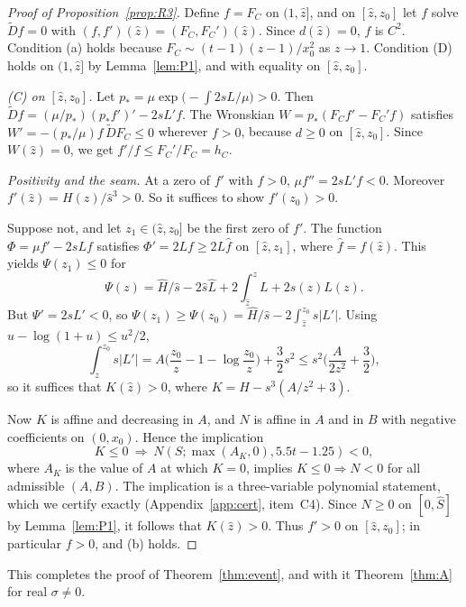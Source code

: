 \documentclass[11pt]{amsart}
\theoremstyle{definition}
\theoremstyle{remark}
\numberwithin{equation}{section}
\begin{document}
\begin{proof}[Proof of Proposition~\ref{prop:R3}]
Define $f=F_C$ on $(1,\hat z]$, and on $[\hat z,z_0]$ let $f$ solve $\widetilde Df=0$ with $(f,f')(\hat z)=(F_C,F_C')(\hat z)$.
Since $d(\hat z)=0$, $f$ is $C^2$. Condition (a) holds because $F_C\sim(t-1)(z-1)/x_0^2$ as $z\to1$. Condition (D) holds on
$(1,\hat z]$ by Lemma~\ref{lem:P1}, and with equality on $[\hat z,z_0]$.

\emph{(C) on $[\hat z,z_0]$.} Let $p_*=\mu\exp\big(-\int2sL/\mu\big)>0$. Then
$\widetilde Df=(\mu/p_*)(p_*f')'-2sL'f$. The Wronskian $W=p_*(F_Cf'-F_C'f)$ satisfies
$W'=-(p_*/\mu)f\,\widetilde DF_C\le0$ wherever $f>0$, because $d\ge0$ on $[\hat z,z_0]$. Since $W(\hat z)=0$, we get
$f'/f\le F_C'/F_C=h_C$.

\emph{Positivity and the seam.} At a zero of $f'$ with $f>0$, $\mu f''=2sL'f<0$. Moreover
$f'(\hat z)=H(\hat z)/\hat s^3>0$. So it suffices to show $f'(z_0)>0$.

Suppose not, and let $z_1\in(\hat z,z_0]$ be the first zero of $f'$. The function $\Phi=\mu f'-2sLf$ satisfies
$\Phi'=2Lf\ge2L\hat f$ on $[\hat z,z_1]$, where $\hat f=f(\hat z)$. This yields
$\Psi(z_1)\le0$ for
\[
\Psi(z)=\hat H/\hat s-2\hat s\hat L+2\int_{\hat z}^zL+2s(z)L(z).
\]
But $\Psi'=2sL'<0$, so $\Psi(z_1)\ge\Psi(z_0)=\hat H/\hat s-2\int_{\hat z}^{z_0}s|L'|$. Using
$u-\log(1+u)\le u^2/2$,
\[
\int_z^{z_0}s|L'|=A\Big(\frac{z_0}{z}-1-\log\frac{z_0}{z}\Big)+\frac32s^2\le s^2\Big(\frac{A}{2z^2}+\frac32\Big),
\]
so it suffices that $K(\hat z)>0$, where $K=H-s^3(A/z^2+3)$.

Now $K$ is affine and decreasing in $A$, and $N$ is affine in $A$ and in $B$ with negative coefficients on
$(0,x_0)$. Hence the implication
\[
K\le0\ \Longrightarrow\ N(S;\max(A_K,0),5.5t-1.25)<0,
\]
where $A_K$ is the value of $A$ at which $K=0$, implies $K\le0\Rightarrow N<0$ for all admissible $(A,B)$. The
implication is a three-variable polynomial statement, which we certify exactly (Appendix~\ref{app:cert}, item~C4).
Since $N\ge0$ on $[0,\hat S]$ by Lemma~\ref{lem:P1}, it follows that $K(\hat z)>0$. Thus $f'>0$ on $[\hat z,z_0]$;
in particular $f>0$, and (b) holds.
\end{proof}

This completes the proof of Theorem~\ref{thm:event}, and with it Theorem~\ref{thm:A} for real $\sigma\ne0$.
\end{document}
